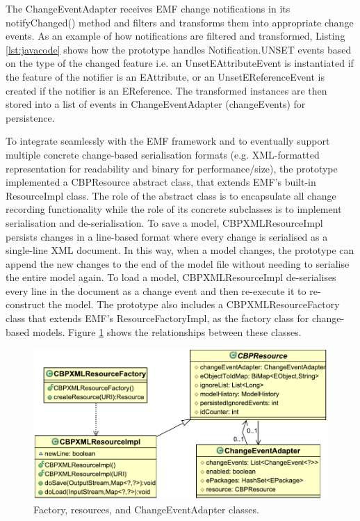 The \textsf{ChangeEventAdapter} receives EMF change notifications in its \textsf{notifyChanged()} method and filters and transforms them into appropriate change events. As an example of how notifications are filtered and transformed, Listing \ref{lst:javacode} shows how the prototype handles \textsf{Notification.UNSET} events based on the type of the changed feature i.e. an \textsf{UnsetEAttributeEvent} is instantiated if the feature of the notifier is an \textsf{EAttribute}, or an \textsf{UnsetEReferenceEvent}  is created if the notifier is an \textsf{EReference}. The transformed instances are then stored into a list of events in \textsf{ChangeEventAdapter} (\textsf{changeEvents}) for persistence. 

To integrate seamlessly with the EMF framework and to eventually support multiple concrete change-based serialisation formats (e.g. XML-formatted representation for readability and binary for performance/size), the prototype implemented a \textsf{CBPResource} abstract class, that extends EMF's built-in \textsf{ResourceImpl} class. The role of the abstract class is to encapsulate all change recording functionality while the role of its concrete subclasses is to implement serialisation and de-serialisation. 
To save a model, \textsf{CBPXMLResourceImpl} persists changes in a line-based format where every change is serialised as a single-line XML document. In this way, when a model changes, the prototype can append the new changes to the end of the model file without needing to serialise the entire model again. 
To load a model, \textsf{CBPXMLResourceImpl} de-serialises every line in the document as a change event and then re-execute it to re-construct the model.
The prototype also includes a \textsf{CBPXMLResourceFactory} class that extends EMF's \textsf{ResourceFactoryImpl}, as the factory class for change-based models. Figure \ref{fig:resources} shows the relationships between these classes.

\begin{figure}[th]
  \centering
  \includegraphics[width=\linewidth]{resources}
  \caption{Factory, resources, and ChangeEventAdapter classes.}
  \label{fig:resources}
\end{figure}

